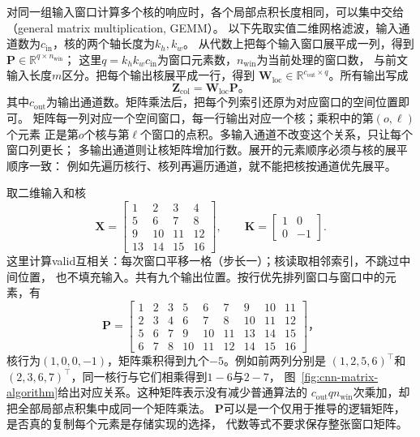 对同一组输入窗口计算多个核的响应时，各个局部点积长度相同，可以集中交给
（general matrix multiplication, GEMM）。
以下先取实值二维网格滤波，输入通道数为$c_{\mathrm{in}}$，核的两个轴长度为$k_h,k_w$。
从代数上把每个输入窗口展平成一列，得到$\bm P\in\mathbb R^{q\times n_{\mathrm{win}}}$；
这里$q=k_hk_wc_{\mathrm{in}}$为窗口元素数，$n_{\mathrm{win}}$为当前处理的窗口数，
与前文输入长度$m$区分。把每个输出核展平成一行，得到
$\bm W_{\mathrm{loc}}\in\mathbb R^{c_{\mathrm{out}}\times q}$。所有输出写成
\begin{equation}
  \bm Z_{\mathrm{col}}=\bm W_{\mathrm{loc}}\bm P\text{。}
  \label{eq:signal-analysis-window-matrix-product}
\end{equation}
其中$c_{\mathrm{out}}$为输出通道数。矩阵乘法后，把每个列索引还原为对应窗口的空间位置即可。
矩阵每一列对应一个空间窗口，每一行输出对应一个核；乘积中的第$(o,\ell)$个元素
正是第$o$个核与第$\ell$个窗口的点积。多输入通道不改变这个关系，只让每个窗口列更长；
多输出通道则让核矩阵增加行数。展开的元素顺序必须与核的展平顺序一致：
例如先遍历核行、核列再遍历通道，就不能把核按通道优先展平。

取二维输入和核
\begin{equation}
 \bm X=\begin{bmatrix}1&2&3&4\\5&6&7&8\\9&10&11&12\\13&14&15&16\end{bmatrix},
 \qquad \bm K=\begin{bmatrix}1&0\\0&-1\end{bmatrix}.
 \label{eq:signal-analysis-matrix-filter-example}
\end{equation}
这里计算valid互相关：每次窗口平移一格（步长一）；核读取相邻索引，不跳过中间位置，
也不填充输入。共有九个输出位置。按行优先排列窗口与窗口中的元素，有
\begin{equation}
  \bm P=\begin{bmatrix}
    1&2&3&5&6&7&9&10&11\\
    2&3&4&6&7&8&10&11&12\\
    5&6&7&9&10&11&13&14&15\\
    6&7&8&10&11&12&14&15&16
  \end{bmatrix}\text{，}
  \label{eq:cnn-im2col-example}
\end{equation}
核行为$(1,0,0,-1)$，矩阵乘积得到九个$-5$。例如前两列分别是
$(1,2,5,6)^\top$和$(2,3,6,7)^\top$，同一核行与它们相乘得到$1-6$与$2-7$，
图~\ref{fig:cnn-matrix-algorithm}给出对应关系。这种矩阵表示没有减少普通算法的
$c_{\mathrm{out}}q n_{\mathrm{win}}$次乘加，却把全部局部点积集中成同一个矩阵乘法。
$\bm P$可以是一个仅用于推导的逻辑矩阵，是否真的复制每个元素是存储实现的选择，
代数等式不要求保存整张窗口矩阵。


